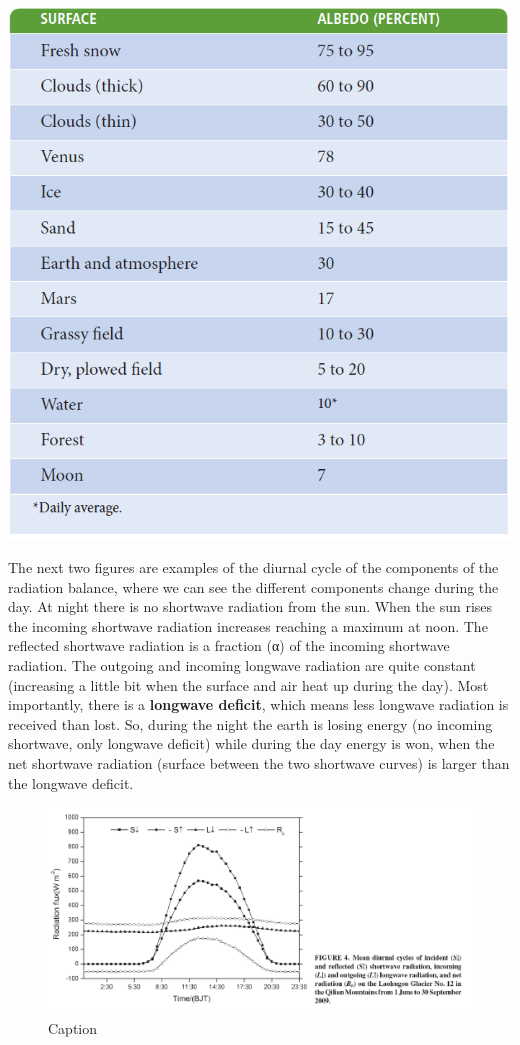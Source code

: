 \documentclass[12pt,oneside]{book}
\begin{document}
\pagebreak

\begin{center}
\label{table:albedos}

\begin{center}\includegraphics[width=0.8\linewidth]{figures/Table13} \end{center}
\end{center}

The next two figures are examples of the diurnal cycle of the components
of the radiation balance, where we can see the different components
change during the day. At night there is no shortwave radiation from the
sun. When the sun rises the incoming shortwave radiation increases
reaching a maximum at noon. The reflected shortwave radiation is a
fraction (α) of the incoming shortwave radiation. The outgoing and
incoming longwave radiation are quite constant (increasing a little bit
when the surface and air heat up during the day). Most importantly,
there is a \textbf{longwave deficit}, which means less longwave
radiation is received than lost. So, during the night the earth is
losing energy (no incoming shortwave, only longwave deficit) while
during the day energy is won, when the net shortwave radiation (surface
between the two shortwave curves) is larger than the longwave deficit.

\begin{figure}

{\centering \includegraphics[width=0.77\linewidth]{figures/Figure136} 

}

\caption{Caption}\label{fig:RadiationCycle}
\end{figure}
\end{document}
